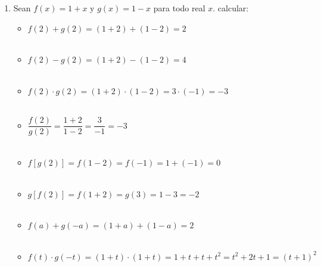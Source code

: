 \begin{enumerate}[ \bfseries 1.]
        \item Sean $f(x)= 1+x$ \; y \; $g(x)=1-x$ para todo real $x$. calcular:
            \begin{itemize}
                \item $f(2)+g(2) = (1+2) + (1-2) = 2$\\\\
                \item $f(2)-g(2) = (1+2) - (1-2) = 4$\\\\
                \item $f(2)\cdot g(2) = (1+2) \cdot (1-2) = 3 \cdot (-1) = -3$\\\\
                \item $\dfrac{f(2)}{g(2)}= \dfrac{1+2}{1-2} = \dfrac{3}{-1} = -3$\\\\
                \item $f\left[ g(2)\right] = f(1-2) = f(-1) = 1+(-1)= 0$\\\\
                \item $g\left[ f(2)\right] = f(1+2) = g(3) = 1 - 3 = -2$\\\\
                \item $f(a) + g(-a) = (1+a) + (1 - a) = 2$\\\\
                \item $f(t)\cdot g(-t) = (1+t) \cdot (1+t) = 1 + t + t + t^2 = t^2 +2t + 1 = (t+1)^2$\\\\
            \end{itemize}
        

\end{enumerate}
